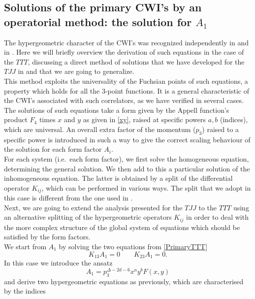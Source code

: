 \documentclass[a4paper,11pt,openright,twoside]{book}
\numberwithin{equation}{section}
\begin{document}
{{\subsection{Solutions of the primary CWI's by an operatorial method: the solution for $A_1$}
\label{fuchs}
The hypergeometric character of the CWI's was recognized independently in \cite{Coriano:2013jba} and in \cite{Bzowski:2011ab}. Here we will briefly overview the derivation of such equations in the case of the $TTT$, discussing a direct method of solutions that we have developed for the $TJJ$ in \cite{Coriano:2018bbe} and that we are going to generalize.\\
This method exploits the universality of the Fuchsian points of such equations, a property which holds for all the 3-point functions. It is a general characteristic of the CWI's associated with such correlators, as we have verified in several cases. 
The solutions of such equations take a form given by the Appell function's product $F_4$ times $x$ and $y$ as given in \eqref{xy}, raised at specific powers $a,b$ (indices), which are universal. An overall extra factor of the momentum ($p_3$) raised to a specific power is introduced in such a way to give the correct scaling behaviour of the solution for each form factor $A_i$. \\
For each system (i.e.~each form factor), we first solve the homogeneous equation, determining the general solution. We then add to this a particular solution of the inhomogeneous equation. The latter is obtained by a split of the differential operator $K_{ij}$, which can be performed in various ways. 
The split that we adopt in this case is different from the one used in \cite{Coriano:2018bbe}. \\
Next, we are going to extend the analysis presented for the $TJJ$  to the $TTT$ using an alternative splitting of the hypergeometric operators $K_{i j}$ in order to deal with the more complex structure of the global system of equations which should be satisfied by the form factors. \\
We start from $A_1$ by solving the two equations from \eqref{PrimaryTTT}
\begin{equation}
K_{13}A_1=0   \qquad K_{23}A_1=0.
\end{equation}
In this case we introduce the ansatz 
\begin{equation}
A_1=p_3^{\Delta-2 d - 6}x^a y^b  F(x,y)
\end{equation}
and derive two hypergeometric equations as previously, which are characterised by the indices 
}}
\end{document}
